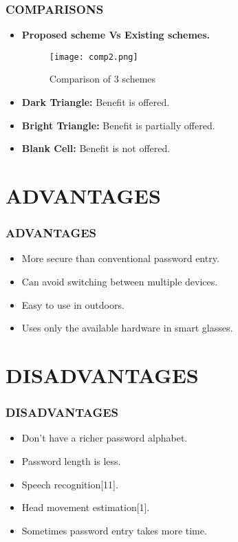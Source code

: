\documentclass{beamer}
\begin{document}
\begin{frame}
\frametitle{COMPARISONS}

\begin{itemize}
\justifying
    
    \item \textbf{Proposed scheme Vs Existing schemes.}
    
    \begin{figure}
    \begin{center}
        \texttt{[image: comp2.png]}
        \caption{Comparison of 3 schemes}
    \end{center}
\end{figure}
    
    \item \textbf{Dark Triangle:} Benefit is offered.
    \item \textbf{Bright Triangle:} Benefit is partially offered.
    \item \textbf{Blank Cell:} Benefit is not offered.

\end{itemize}


\end{frame}

\section{ADVANTAGES}
\begin{frame}
\frametitle{ ADVANTAGES }
\begin{itemize}
\item More secure than conventional password entry.
\item Can avoid switching between multiple devices.
\item Easy to use in outdoors.
\item Uses only the available hardware in smart glasses.
\end{itemize}
\end{frame}

\section{DISADVANTAGES}
\begin{frame}
\frametitle{ DISADVANTAGES }
\begin{itemize}
\item Don't have a richer password alphabet.
\item Password length is less.
\item Speech recognition[11].
\item Head movement estimation[1].
\item Sometimes password entry takes more time.
\end{itemize}
\end{frame}
\end{document}
